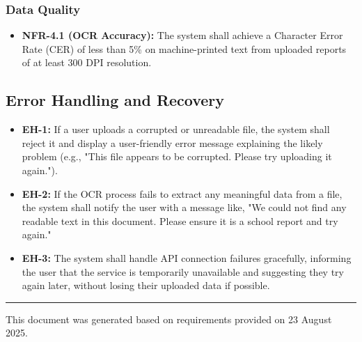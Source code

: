 \documentclass[a4paper, 11pt]{article}
\begin{document}
\subsubsection{Data Quality}
\begin{itemize}[label={\color{AUCDTCampusGreen}\faCheckDouble}]
    \item \textbf{NFR-4.1 (OCR Accuracy):} The system shall achieve a Character Error Rate (CER) of less than 5\% on machine-printed text from uploaded reports of at least 300 DPI resolution.
\end{itemize}

\subsection{Error Handling and Recovery}
\begin{itemize}[label={\color{AUCDTBurgundy}\faExclamationCircle}]
    \item \textbf{EH-1:} If a user uploads a corrupted or unreadable file, the system shall reject it and display a user-friendly error message explaining the likely problem (e.g., "This file appears to be corrupted. Please try uploading it again.").
    \item \textbf{EH-2:} If the OCR process fails to extract any meaningful data from a file, the system shall notify the user with a message like, "We could not find any readable text in this document. Please ensure it is a school report and try again."
    \item \textbf{EH-3:} The system shall handle API connection failures gracefully, informing the user that the service is temporarily unavailable and suggesting they try again later, without losing their uploaded data if possible.
\end{itemize}


\vfill
\hrule
\vspace{2mm}
\begin{center}
    \poppinslight
    This document was generated based on requirements provided on 23 August 2025.
\end{center}
\end{document}
